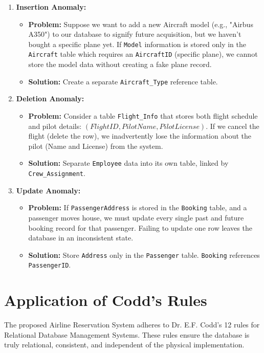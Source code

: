 \documentclass[12pt, a4paper]{article}
\begin{document}
	\begin{enumerate}
		\item \textbf{Insertion Anomaly:}
		\begin{itemize}
			\item \textbf{Problem:} Suppose we want to add a new Aircraft model (e.g., "Airbus A350") to our database to signify future acquisition, but we haven't bought a specific plane yet. If \texttt{Model} information is stored only in the \texttt{Aircraft} table which requires an \texttt{AircraftID} (specific plane), we cannot store the model data without creating a fake plane record.
			\item \textbf{Solution:} Create a separate \texttt{Aircraft\_Type} reference table.
		\end{itemize}
		
		\item \textbf{Deletion Anomaly:}
		\begin{itemize}
			\item \textbf{Problem:} Consider a table \texttt{Flight\_Info} that stores both flight schedule and pilot details: $(FlightID, PilotName, PilotLicense)$. If we cancel the flight (delete the row), we inadvertently lose the information about the pilot (Name and License) from the system.
			\item \textbf{Solution:} Separate \texttt{Employee} data into its own table, linked by \texttt{Crew\_Assignment}.
		\end{itemize}
		
		\item \textbf{Update Anomaly:}
		\begin{itemize}
			\item \textbf{Problem:} If \texttt{PassengerAddress} is stored in the \texttt{Booking} table, and a passenger moves house, we must update every single past and future booking record for that passenger. Failing to update one row leaves the database in an inconsistent state.
			\item \textbf{Solution:} Store \texttt{Address} only in the \texttt{Passenger} table. \texttt{Booking} references \texttt{PassengerID}.
		\end{itemize}
	\end{enumerate}
	
	\newpage
	\section{Application of Codd's Rules}
	
	The proposed Airline Reservation System adheres to Dr. E.F. Codd’s 12 rules for Relational Database Management Systems. These rules ensure the database is truly relational, consistent, and independent of the physical implementation.\\
	
\end{document}
